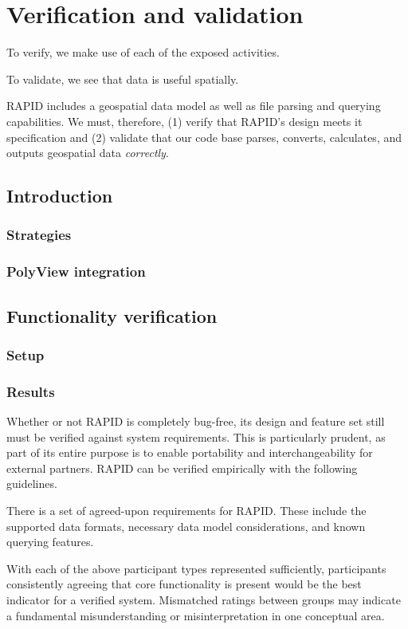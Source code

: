 \chapter{Verification and validation}



To verify, we make use of each of the exposed activities.

To validate, we see that data is useful spatially.

RAPID includes a geospatial data model as well as file parsing and querying capabilities. We must, therefore, (1) verify that RAPID's design meets it specification and (2) validate that our code base parses, converts, calculates, and outputs geospatial data \textit{correctly}.

\section{Introduction}
\subsection{Strategies}
\subsection{PolyView integration}


\section{Functionality verification}
\subsection{Setup}
\subsection{Results}
Whether or not RAPID is completely bug-free, its design and feature set still must be verified against system requirements. This is particularly prudent, as part of its entire purpose is to enable portability and interchangeability for external partners. RAPID can be verified empirically with the following guidelines.

There is a set of agreed-upon requirements for RAPID. These include the supported data formats, necessary data model considerations, and known querying features.

With each of the above participant types represented sufficiently, participants consistently agreeing that core functionality is present would be the best indicator for a verified system. Mismatched ratings between groups may indicate a fundamental misunderstanding or misinterpretation in one conceptual area.

